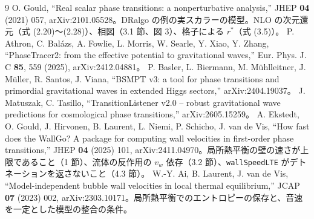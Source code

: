 \documentclass[a4paper,10pt]{ltjsarticle}
\begin{document}
\begin{thebibliography}{9}
 O. Gould, ``Real scalar phase transitions: a nonperturbative analysis,'' JHEP \textbf{04} (2021) 057, arXiv:2101.05528。DRalgo の例の実スカラーの模型。NLO の次元還元（式 (2.20)〜(2.28)）、相図（3.1 節、図 3）、格子による $r^*$（式 (3.5)）。
 P. Athron, C. Bal\'azs, A. Fowlie, L. Morris, W. Searle, Y. Xiao, Y. Zhang, ``PhaseTracer2: from the effective potential to gravitational waves,'' Eur. Phys. J. C \textbf{85}, 559 (2025), arXiv:2412.04881。
 P. Basler, L. Biermann, M. M\"uhlleitner, J. M\"uller, R. Santos, J. Viana, ``BSMPT v3: a tool for phase transitions and primordial gravitational waves in extended Higgs sectors,'' arXiv:2404.19037。
 J. Matuszak, C. Tasillo, ``TransitionListener v2.0 -- robust gravitational wave predictions for cosmological phase transitions,'' arXiv:2605.15259。
 A. Ekstedt, O. Gould, J. Hirvonen, B. Laurent, L. Niemi, P. Schicho, J. van de Vis, ``How fast does the WallGo? A package for computing wall velocities in first-order phase transitions,'' JHEP \textbf{04} (2025) 101, arXiv:2411.04970。局所熱平衡の壁の速さが上限であること（1 節）、流体の反作用の $v_w$ 依存（3.2 節）、\texttt{wallSpeedLTE} がデトネーションを返さないこと（4.3 節）。
 W.-Y. Ai, B. Laurent, J. van de Vis, ``Model-independent bubble wall velocities in local thermal equilibrium,'' JCAP \textbf{07} (2023) 002, arXiv:2303.10171。局所熱平衡でのエントロピーの保存と、音速を一定とした模型の整合の条件。
\end{thebibliography}
\end{document}
